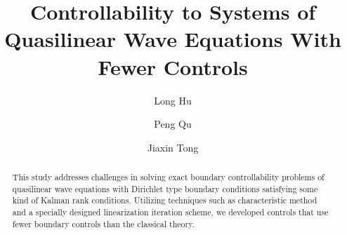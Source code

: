 \documentclass[a4paper,reqno,11pt]{amsart}
\numberwithin{equation}{section} %
\begin{document}
\title{Controllability to Systems of Quasilinear Wave Equations 
With Fewer Controls}


\author{Long Hu}
\address{School of Mathematical Sciences\\ Shandong University\\Shandong 250100, China}



\author{Peng Qu}
\address{School of Mathematical Sciences\\ Fudan University\\
Shanghai 200433, China
\newline \indent and
\newline \indent The Institute of Mathematical Sciences\\
The Chinese University of Hong Kong\\
Shatin, NT, Hong Kong}

\author{Jiaxin Tong}
\address{School of Mathematical Sciences\\ Fudan University\\
Shanghai 200433, China}




\begin{abstract}
	This study addresses challenges in solving exact boundary controllability problems of quasilinear wave equations with Dirichlet type boundary conditions satisfying some kind of 
	Kalman rank conditions. Utilizing techniques such as characteristic method and a specially designed linearization iteration scheme, we developed controls that use fewer boundary 
	controls than the classical theory.
\end{abstract} %
\end{document}

